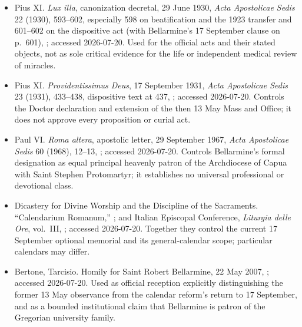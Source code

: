 \begin{itemize}
\item Pius XI.  \emph{Lux illa}, canonization decretal, 29 June 1930,
\emph{Acta Apostolicae Sedis} 22 (1930), 593--602, especially 598 on
beatification and the 1923 transfer and 601--602 on the dispositive act (with
Bellarmine's 17 September clause on p.~601),
; accessed 2026-07-20.  Used for the official acts and their stated
objects, not as sole critical evidence for the life or independent medical
review of miracles.

\item Pius XI.  \emph{Providentissimus Deus}, 17 September 1931,
\emph{Acta Apostolicae Sedis} 23 (1931), 433--438, dispositive text at 437,
; accessed 2026-07-20.  Controls the Doctor declaration and extension of
the then 13 May Mass and Office; it does not approve every proposition or
curial act.

\item Paul VI.  \emph{Roma altera}, apostolic letter, 29 September 1967,
\emph{Acta Apostolicae Sedis} 60 (1968), 12--13,
; accessed 2026-07-20.  Controls Bellarmine's formal designation as
equal principal heavenly patron of the Archdiocese of Capua with Saint Stephen
Protomartyr; it establishes no universal professional or devotional class.

\item Dicastery for Divine Worship and the Discipline of the Sacraments.
``Calendarium Romanum,''
; and Italian Episcopal Conference, \emph{Liturgia delle
Ore}, vol.~III,
; accessed 2026-07-20.  Together they control the
current 17 September optional memorial and its general-calendar scope;
particular calendars may differ.

\item Bertone, Tarcisio.  Homily for Saint Robert Bellarmine, 22 May 2007,
; accessed 2026-07-20.  Used as official reception explicitly
distinguishing the former 13 May observance from the calendar reform's return
to 17 September, and as a bounded institutional claim that Bellarmine is
patron of the Gregorian university family.


\end{itemize}
